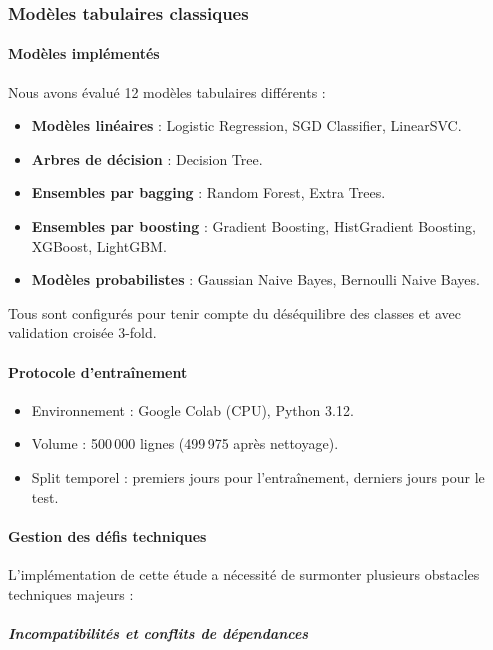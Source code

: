 ﻿\documentclass[11pt,a4paper]{article}
\begin{document}
\subsubsection{Modèles tabulaires classiques}

\paragraph{Modèles implémentés}

Nous avons évalué 12 modèles tabulaires différents :
\begin{itemize}
    \item \textbf{Modèles linéaires} : Logistic Regression, SGD Classifier, LinearSVC.
    \item \textbf{Arbres de décision} : Decision Tree.
    \item \textbf{Ensembles par bagging} : Random Forest, Extra Trees.
    \item \textbf{Ensembles par boosting} : Gradient Boosting, HistGradient Boosting, XGBoost, LightGBM.
    \item \textbf{Modèles probabilistes} : Gaussian Naive Bayes, Bernoulli Naive Bayes.
\end{itemize}

Tous sont configurés pour tenir compte du déséquilibre des classes et avec validation croisée 3-fold.

\paragraph{Protocole d'entraînement}

\begin{itemize}
    \item Environnement : Google Colab (CPU), Python 3.12.
    \item Volume : 500\,000 lignes (499\,975 après nettoyage).
    \item Split temporel : premiers jours pour l'entraînement, derniers jours pour le test.
\end{itemize}

\paragraph{Gestion des défis techniques}

L'implémentation de cette étude a nécessité de surmonter plusieurs obstacles techniques majeurs :

\subparagraph{Incompatibilités et conflits de dépendances}
\end{document}
